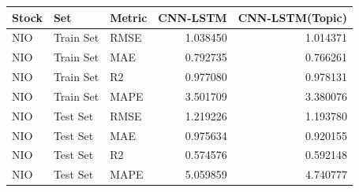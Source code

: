 \begin{tabular}{lllrr}
\toprule
Stock & Set & Metric & CNN-LSTM & CNN-LSTM(Topic) \\
\midrule
NIO & Train Set & RMSE & 1.038450 & 1.014371 \\
NIO & Train Set & MAE & 0.792735 & 0.766261 \\
NIO & Train Set & R2 & 0.977080 & 0.978131 \\
NIO & Train Set & MAPE & 3.501709 & 3.380076 \\
NIO & Test Set & RMSE & 1.219226 & 1.193780 \\
NIO & Test Set & MAE & 0.975634 & 0.920155 \\
NIO & Test Set & R2 & 0.574576 & 0.592148 \\
NIO & Test Set & MAPE & 5.059859 & 4.740777 \\
\bottomrule
\end{tabular}
